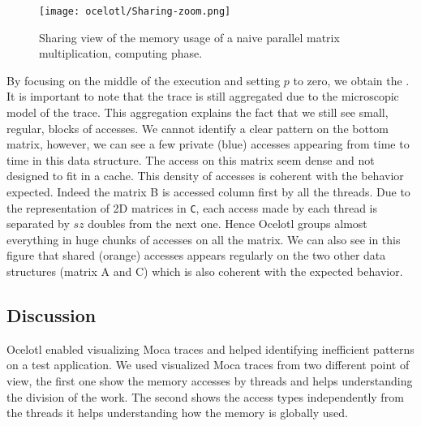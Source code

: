 \begin{figure}[htb]
    \centering
    \texttt{[image: ocelotl/Sharing-zoom.png]}
    \caption{Sharing view of the memory usage of a naive parallel matrix multiplication, computing phase.}
    \label{fig:ocelotl-Carto-zoom}
\end{figure}

By focusing on the middle of the execution and setting $p$ to zero, we obtain the .
It is important to note that the trace is still aggregated due to the microscopic model of the trace.
This aggregation explains the fact that we still see small, regular, blocks of accesses.
We cannot identify a clear pattern on the bottom matrix, however, we can see a few private (blue) accesses appearing from time to time in this data structure.
The access on this matrix seem dense and not designed to fit in a cache.
This density of accesses is coherent with the behavior expected.
Indeed the matrix B is accessed column first by all the threads.
Due to the representation of 2D matrices in \texttt{C}, each access made by each thread is separated by $sz$ doubles from the next one.
Hence \gls{Ocelotl} groups almost everything in huge chunks of accesses on all the matrix.
We can also see in this figure that shared (orange) accesses appears regularly on the two other data structures (matrix A and C) which is also coherent with the expected behavior.

\subsection{Discussion}

\gls{Ocelotl} enabled visualizing \gls{Moca} traces and helped identifying inefficient patterns on a test application.
We used visualized \gls{Moca} traces from two different point of view, the first one show the memory accesses by threads and helps understanding the division of the work.
The second shows the access types independently from the threads it helps understanding how the memory is globally used.

